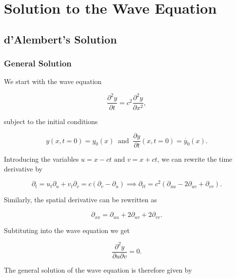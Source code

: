 \documentclass[a4paper,12pt]{report}
\begin{document}


\section{Solution to the Wave Equation}

\subsection{d'Alembert's Solution}

\subsubsection{General Solution}

We start with the wave equation 

\begin{equation}
	\frac{\partial^2 y}{\partial t} = c^2 \frac{\partial^2 y}{\partial x^2}, \label{waveequation} 
\end{equation}

subject to the initial conditions 

\begin{equation}
	y(x,t=0) = y_0 (x) ~\text { and }~ \frac{\partial y}{\partial t} (x,t=0) = \dot{y_0 }(x). 
\end{equation}

Introducing the variables \(u = x-ct \text { and }  v = x+ct\), we can rewrite the time derivative by 

\begin{equation}
	\partial _{t} = u_{t}\partial _{u} + v_{t}\partial _{v} = c(\partial _{v} - \partial _{u}  ) \implies \partial _{tt} = c^2(\partial _{uu} - 2 \partial _{uv} + \partial _{vv}  ).      
\end{equation}

Similarly, the spatial derivative can be rewritten as 

\begin{equation}
	\partial _{xx} = \partial _{uu} + 2 \partial _{uv} + 2 \partial _{vv}.    
\end{equation}

Subtituting into the wave equation we get 

\begin{equation}
	\frac{\partial^2 y}{\partial u \partial v} = 0. 
\end{equation}

The general solution of the wave equation is therefore given by
\end{document}
